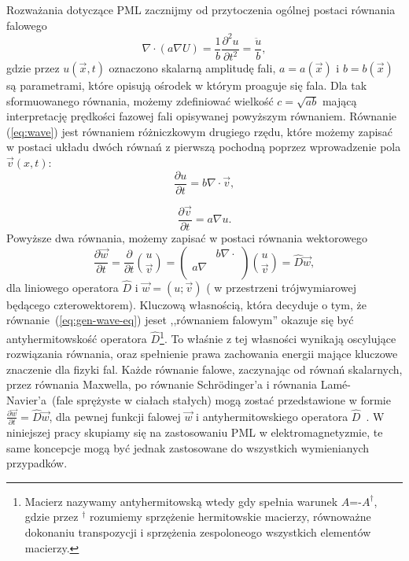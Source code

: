 Rozważania dotyczące PML zacznijmy od przytoczenia ogólnej postaci równania falowego~\cite{barton1989elements}
\begin{equation}
\nabla \cdot ( a \nabla U) = \frac{1}{b} \frac{\partial^2 u}{\partial t^2} = \frac{\ddot{u}}{b},
\label{eq:wave}
\end{equation}
gdzie przez $u(\vec{x},t)$ oznaczono skalarną amplitudę fali, $a=a(\vec{x})$ i $b=b(\vec{x})$ są parametrami, które opisują ośrodek w którym proaguje się fala. Dla tak sformuowanego równania, możemy zdefiniować wielkość $c=\sqrt{ab}$ mającą interpretację prędkości fazowej fali opisywanej powyższym równaniem. Równanie (\ref{eq:wave}) jest równaniem różniczkowym drugiego rzędu, które możemy zapisać w postaci układu dwóch równań z pierwszą pochodną poprzez wprowadzenie pola $\vec{v}(x,t)$:
\begin{equation}
\frac{\partial u}{\partial t} = b \nabla \cdot \vec{v},
\end{equation}

\begin{equation}
\frac{\partial \vec{v}}{\partial t}= a\nabla u.
\end{equation}
Powyższe dwa równania, możemy zapisać  w postaci równania wektorowego
\begin{equation}
\frac{\partial \vec{w}}{\partial t}=\frac{\partial}{\partial t} {u \choose \vec{v}} = 
	\begin{pmatrix}
		& b\nabla\cdot \\
	a\nabla & \\
	\end{pmatrix}
{u \choose \vec{v}} = \hat{D}\vec{w},
\label{eq:gen-wave-eq}
\end{equation}
dla liniowego operatora $\hat{D}$ i $\vec{w}=(u;\vec{v})$ ( w przestrzeni trójwymiarowej będącego czterowektorem). Kluczową własnością, która decyduje o tym, że równanie~(\ref{eq:gen-wave-eq}) jeset ,,równaniem falowym''  okazuje się być antyhermitowskość operatora $\hat{D}$\footnote{Macierz nazywamy antyhermitowską wtedy gdy spełnia warunek $A$=-$A^\dag$, gdzie przez $^\dag$ rozumiemy sprzężenie hermitowskie macierzy, równoważne dokonaniu transpozycji i sprzężenia zespoloneogo wszystkich elementów macierzy.}. To właśnie z tej własności wynikają oscylujące rozwiązania równania, oraz spełnienie prawa zachowania energii mające kluczowe znaczenie dla fizyki fal. Każde równanie falowe, zaczynając od równań skalarnych, przez równania Maxwella,  po równanie Schr\"{o}dinger'a i równania Lam\'{e}-Navier'a~(fale sprężyste w ciałach stałych) mogą zostać przedstawione w formie $ \frac{\partial  \vec{w}}{\partial t}=\hat{D}\vec{w}$, dla pewnej funkcji falowej $\vec{w}$ i antyhermitowskiego operatora $\hat{D}$~\cite{johnson2007notes}. W niniejszej pracy skupiamy się na zastosowaniu PML w elektromagnetyzmie, te same koncepcje mogą być jednak zastosowane do wszystkich wymienianych przypadków.

